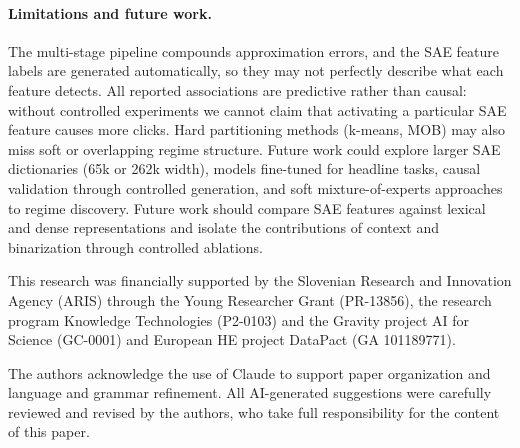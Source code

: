\documentclass[sigconf,natbib=false, language=english]{acmart}
\begin{document}
\paragraph{Limitations and future work.}
The multi-stage pipeline compounds approximation errors, and the SAE feature labels are
generated automatically, so they may not perfectly describe what each feature detects.
All reported associations are predictive rather than causal: without controlled
experiments we cannot claim that activating a particular SAE feature causes more
clicks. Hard partitioning methods (k-means, MOB) may also miss soft or overlapping
regime structure. Future work could explore larger SAE dictionaries (65k or 262k
width), models fine-tuned for headline tasks, causal validation through controlled
generation, and soft mixture-of-experts approaches to regime discovery.
Future work should compare SAE features against lexical and dense representations
and isolate the contributions of context and binarization through controlled ablations.

\begin{acks}
This research was financially supported by the Slovenian Research and Innovation Agency (ARIS)
through the Young Researcher Grant (PR-13856), the research program Knowledge
Technologies (P2-0103) and the Gravity project AI for Science (GC-0001) and European HE
project DataPact (GA 101189771).

The authors acknowledge the use of Claude to support paper organization
and language and grammar refinement. All AI-generated suggestions were carefully
reviewed and revised by the authors, who take full responsibility for the content
of this paper.
\end{acks}

\printbibliography
\end{document}
